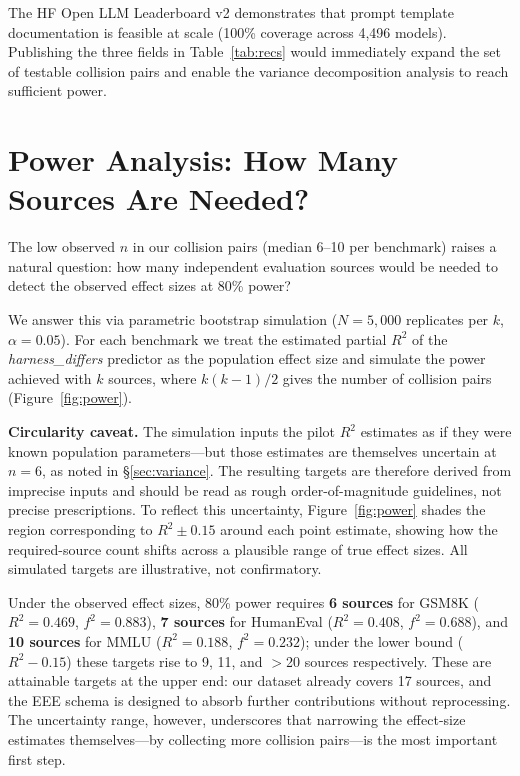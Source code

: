 \documentclass[11pt]{article}
\begin{document}
The HF Open LLM Leaderboard v2 demonstrates that prompt template
documentation is feasible at scale (100\% coverage across 4,496
models). Publishing the three fields in Table~\ref{tab:recs} would
immediately expand the set of testable collision pairs and enable
the variance decomposition analysis to reach sufficient power.

\section{Power Analysis: How Many Sources Are Needed?}
\label{sec:power}

The low observed $n$ in our collision pairs (median 6--10 per benchmark)
raises a natural question: how many independent evaluation sources would
be needed to detect the observed effect sizes at 80\% power?

We answer this via parametric bootstrap simulation ($N=5{,}000$ replicates
per $k$, $\alpha=0.05$). For each benchmark we treat the estimated partial
$R^2$ of the \emph{harness\_differs} predictor as the population effect size
and simulate the power achieved with $k$ sources, where $k(k-1)/2$ gives
the number of collision pairs (Figure~\ref{fig:power}).

\textbf{Circularity caveat.}
The simulation inputs the pilot $R^2$ estimates as if they were known
population parameters---but those estimates are themselves uncertain at
$n=6$, as noted in \S\ref{sec:variance}. The resulting targets are therefore
derived from imprecise inputs and should be read as rough order-of-magnitude
guidelines, not precise prescriptions.
To reflect this uncertainty, Figure~\ref{fig:power} shades the region
corresponding to $R^2 \pm 0.15$ around each point estimate, showing how
the required-source count shifts across a plausible range of true effect
sizes. All simulated targets are illustrative, not confirmatory.

Under the observed effect sizes, 80\% power requires \textbf{6 sources}
for GSM8K ($R^2 = 0.469$, $f^2 = 0.883$), \textbf{7 sources} for HumanEval
($R^2 = 0.408$, $f^2 = 0.688$), and \textbf{10 sources} for MMLU
($R^2 = 0.188$, $f^2 = 0.232$); under the lower bound ($R^2 - 0.15$) these
targets rise to 9, 11, and $>$20 sources respectively.
These are attainable targets at the upper end: our dataset already covers
17 sources, and the EEE schema is designed to absorb further contributions
without reprocessing. The uncertainty range, however, underscores that
narrowing the effect-size estimates themselves---by collecting more collision
pairs---is the most important first step.
\end{document}
